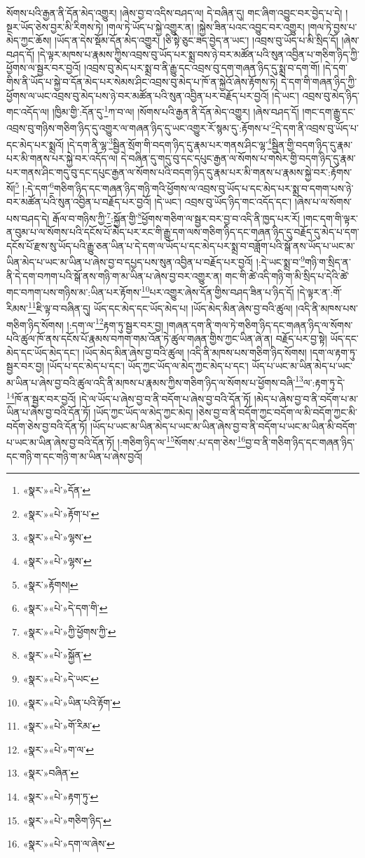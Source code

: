 སོགས་པའི་རྒྱན་ནི་དོན་མེད་འགྱུར། །ཞེས་བྱ་བ་འདིས་བཤད་ལ། དེ་བཞིན་དུ། གང་ཞིག་འབྱུང་བར་བྱེད་པ་དེ། །སྔར་ཡོད་ཅེས་བྱར་མི་རིགས་ཏེ། །གལ་ཏེ་ཡོད་པ་སྐྱེ་འགྱུར་ན། །སྐྱེས་ཟིན་པའང་འབྱུང་བར་འགྱུར། །གལ་ཏེ་བྱས་པ་མེད་ཀྱང་ཆོས། །ཡོད་ན་དེས་སྡོམ་དོན་མེད་འགྱུར། །ཅི་སྟེ་ཅུང་ཟད་བྱེད་ན་ཡང་། །འབྲས་བུ་ཡོད་པ་མི་སྲིད་དོ། །ཞེས་བཤད་དོ། །དེ་ལྟར་མཁས་པ་རྣམས་ཀྱིས་འབྲས་བུ་ཡོད་པར་སྨྲ་བས་ཉེ་བར་མཚོན་པའི་སུན་འབྱིན་པ་གཅིག་ཉིད་ཀྱི་ཕྱོགས་ལ་སྦྱར་བར་བྱའོ། །འབྲས་བུ་མེད་པར་སྨྲ་བ་ནི་རྒྱུ་དང་འབྲས་བུ་དག་གཞན་ཉིད་དུ་སྨྲ་བ་དག་གོ། །དེ་དག་གིས་ནི་ཡོད་པ་སྐྱེ་བ་དོན་མེད་པར་སེམས་ཤིང་འབྲས་བུ་མེད་པ་ཁོ་ན་སྐྱེའོ་ཞེས་རྟོགས་ཏེ། དེ་དག་གི་གཞན་ཉིད་ཀྱི་ཕྱོགས་ལ་ཡང་འབྲས་བུ་མེད་པས་ཉེ་བར་མཚོན་པའི་སུན་འབྱིན་པར་བརྗོད་པར་བྱའོ། །དེ་ཡང་། འབྲས་བུ་མེད་ཉིད་གང་འདོད་ལ། །ཁྱིམ་གྱི་:དོན་དུ་\footnote{«སྣར་»«པེ་»དོན་}ཀ་བ་ལ། །སོགས་པའི་རྒྱན་ནི་དོན་མེད་འགྱུར། །ཞེས་བཤད་དོ། །གང་དག་རྒྱུ་དང་འབྲས་བུ་གཉིས་གཅིག་ཉིད་དུ་འགྱུར་ལ་གཞན་ཉིད་དུ་ཡང་འགྱུར་རོ་སྙམ་དུ་:རྟོགས་པ་\footnote{«སྣར་»«པེ་»རྟོག་པ་}དེ་དག་ནི་འབྲས་བུ་ཡོད་པ་དང་མེད་པར་སྨྲའོ། །དེ་དག་ནི་ལྷ་\footnote{«སྣར་»«པེ་»ལྷས་}སྦྱིན་སྲོག་གི་བདག་ཉིད་དུ་རྣམ་པར་གནས་ཤིང་ལྷ་\footnote{«སྣར་»«པེ་»ལྷས་}སྦྱིན་གྱི་བདག་ཉིད་དུ་རྣམ་པར་མི་གནས་པར་སྐྱེ་བར་འདོད་ལ། དེ་བཞིན་དུ་གདུ་བུ་དང་དཔུང་རྒྱན་ལ་སོགས་པ་གསེར་གྱི་བདག་ཉིད་དུ་རྣམ་པར་གནས་ཤིང་གདུ་བུ་དང་དཔུང་རྒྱན་ལ་སོགས་པའི་བདག་ཉིད་དུ་རྣམ་པར་མི་གནས་པ་རྣམས་སྐྱེ་བར་:རྟོགས་སོ།\footnote{«སྣར་»རྟོགས།} །:དེ་དག་\footnote{«སྣར་»«པེ་»དེ་དག་གི་}གཅིག་ཉིད་དང་གཞན་ཉིད་གཉི་གའི་ཕྱོགས་ལ་འབྲས་བུ་ཡོད་པ་དང་མེད་པར་སྨྲ་བ་དགག་པས་ཉེ་བར་མཚོན་པའི་སུན་འབྱིན་པ་བརྗོད་པར་བྱའོ། །དེ་ཡང་། འབྲས་བུ་ཡོད་ཉིད་གང་འདོད་དང་། །ཞེས་པ་ལ་སོགས་པས་བཤད་དེ། རྒོལ་བ་གཉིས་ཀྱི་\footnote{«སྣར་»«པེ་»ཀྱི་ཕྱོགས་ཀྱི་}:སྐྱོན་གྱི་\footnote{«སྣར་»«པེ་»སྐྱོན་}ཕྱོགས་གཅིག་ལ་སྦྱར་བར་བྱ་བ་འདི་ནི་ཁྱད་པར་རོ། །གང་དག་གི་ལྟར་ན་བུམ་པ་ལ་སོགས་པའི་དངོས་པོ་མེད་པར་རང་གི་རྒྱུ་དག་ལས་གཅིག་ཉིད་དང་གཞན་ཉིད་དུ་བརྗོད་དུ་མེད་པ་དག་དངོས་པོ་རྫས་སུ་ཡོད་པའི་རྒྱུ་ཅན་ཡིན་པ་དེ་དག་ལ་ཡོད་པ་དང་མེད་པར་སྨྲ་བ་བཟློག་པའི་སྒོ་ནས་ཡོད་པ་ཡང་མ་ཡིན་མེད་པ་ཡང་མ་ཡིན་པ་ཞེས་བྱ་བ་དཔྱད་པས་སུན་འབྱིན་པ་བརྗོད་པར་བྱའོ། །:དེ་ཡང་སྨྲ་བ་\footnote{«སྣར་»«པེ་»དེ་ཡང་}གཉི་ག་སྲིད་ན་ནི་དེ་དག་བཀག་པའི་སྒོ་ནས་གཉི་ག་མ་ཡིན་པ་ཞེས་བྱ་བར་འགྱུར་ན། གང་གི་ཚེ་འདི་གཉི་ག་མི་སྲིད་པ་དེའི་ཚེ་གང་བཀག་པས་གཉིས་མ་:ཡིན་པར་རྟོགས་\footnote{«སྣར་»«པེ་»ཡིན་པའི་རྟོག་}པར་འགྱུར་ཞེས་དོན་གྱིས་བཤད་ཟིན་པ་ཉིད་དོ། །དེ་ལྟར་ན་:གོ་རིམས་\footnote{«སྣར་»«པེ་»གོ་རིམ་}ཇི་ལྟ་བ་བཞིན་དུ། ཡོད་དང་མེད་དང་ཡོད་མེད་པ། །ཡོད་མེད་མིན་ཞེས་བྱ་བའི་ཚུལ། །འདི་ནི་མཁས་པས་གཅིག་ཉིད་སོགས། །:དག་ལ་\footnote{«སྣར་»«པེ་»ག་ལ་}རྟག་ཏུ་སྦྱར་བར་བྱ། །གཞན་དག་ནི་གལ་ཏེ་གཅིག་ཉིད་དང་གཞན་ཉིད་ལ་སོགས་པའི་ཚུལ་ཁོ་ནས་དངོས་པོ་རྣམས་བཀག་གམ་འོན་ཏེ་ཚུལ་གཞན་གྱིས་ཀྱང་ཡིན་ཞེ་ན། བརྗོད་པར་བྱ་སྟེ། ཡོད་དང་མེད་དང་ཡོད་མེད་དང་། །ཡོད་མེད་མིན་ཞེས་བྱ་བའི་ཚུལ། །འདི་ནི་མཁས་པས་གཅིག་ཉིད་སོགས། །དག་ལ་རྟག་ཏུ་སྦྱར་བར་བྱ། །ཡོད་པ་དང་མེད་པ་དང་། ཡོད་ཀྱང་ཡོད་ལ་མེད་ཀྱང་མེད་པ་དང་། ཡོད་པ་ཡང་མ་ཡིན་མེད་པ་ཡང་མ་ཡིན་པ་ཞེས་བྱ་བའི་ཚུལ་འདི་ནི་མཁས་པ་རྣམས་ཀྱིས་གཅིག་ཉིད་ལ་སོགས་པ་ཕྱོགས་བཞི་\footnote{«སྣར་»བཞིན་}ལ་:རྟག་ཏུ་དེ་\footnote{«སྣར་»«པེ་»རྟག་ཏུ་}ཁོ་ན་སྦྱར་བར་བྱའོ། །དེ་ལ་ཡོད་པ་ཞེས་བྱ་བ་ནི་བདོག་པ་ཞེས་བྱ་བའི་དོན་ཏོ། །མེད་པ་ཞེས་བྱ་བ་ནི་བདོག་པ་མ་ཡིན་པ་ཞེས་བྱ་བའི་དོན་ཏོ། །ཡོད་ཀྱང་ཡོད་ལ་མེད་ཀྱང་མེད། །ཅེས་བྱ་བ་ནི་བདོག་ཀྱང་བདོག་ལ་མི་བདོག་ཀྱང་མི་བདོག་ཅེས་བྱ་བའི་དོན་ཏོ། །ཡོད་པ་ཡང་མ་ཡིན་མེད་པ་ཡང་མ་ཡིན་ཞེས་བྱ་བ་ནི་བདོག་པ་ཡང་མ་ཡིན་མི་བདོག་པ་ཡང་མ་ཡིན་ཞེས་བྱ་བའི་དོན་ཏོ། །:གཅིག་ཉིད་ལ་\footnote{«སྣར་»«པེ་»གཅིག་ཉིད་}སོགས་:པ་དག་ཅེས་\footnote{«སྣར་»«པེ་»དག་ལ་ཞེས་}བྱ་བ་ནི་གཅིག་ཉིད་དང་གཞན་ཉིད་དང་གཉི་ག་དང་གཉི་ག་མ་ཡིན་པ་ཞེས་བྱའོ། 